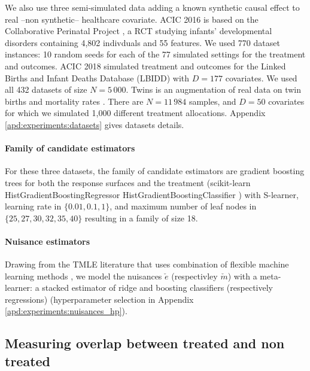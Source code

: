 \documentclass[a4paper,num-refs]{oup-contemporary}%
\begin{document}
We also use three semi-simulated
data adding a known synthetic causal effect to real --non synthetic-- healthcare
covariate. ACIC 2016 \cite{dorie_automated_2019} is based on the Collaborative
Perinatal Project \cite{niswander_women_1972}, a RCT studying infants’
developmental disorders containing 4,802 indivduals and 55 features. We used 770
dataset instances: 10 random seeds for each of the 77 simulated settings for the
treatment and outcomes.  ACIC 2018 \cite{shimoni_benchmarking_2018} simulated
treatment and outcomes for the Linked Births and Infant Deaths Database (LBIDD)
\cite{macdorman_infant_1998} with $D=177$ covariates. We used all 432 datasets
of size $N=5\,000$.  Twins \cite{louizos_causal_2017} is an augmentation of real
data on twin births and mortality rates \cite{almond_costs_2005}. There are
$N=11\,984$ samples, and $D=50$ covariates for which we simulated 1,000
different treatment allocations. Appendix
\ref{apd:experiments:datasets} gives datasets details.


\paragraph{Family of candidate
    estimators}\label{semi_simulated:candidate_estimators}

For these three datasets, the family of candidate estimators are gradient
boosting trees for both the response surfaces and the treatment
(scikit-learn HistGradientBoostingRegressor HistGradientBoostingClassifier  \cite{pedregosa_scikitlearn_2011})
with S-learner, learning rate
in $\{0.01, 0.1, 1\}$, and maximum number of leaf nodes in $\{25, 27, 30, 32,
    35, 40\}$ resulting in a family of size 18.

\paragraph{Nuisance estimators}

Drawing from the TMLE literature that uses combination of flexible
machine learning methods \cite{schuler_targeted_2017}, we model the nuisances
$\check e$ (respectivley $\check m$) with a meta-learner: a stacked estimator of ridge
and boosting classifiers (respectively regressions) (hyperparameter selection in Appendix \ref{apd:experiments:nuisances_hp}).


\subsection{Measuring overlap between treated and non treated}\label{subsec:measuring_overlap}
\end{document}
